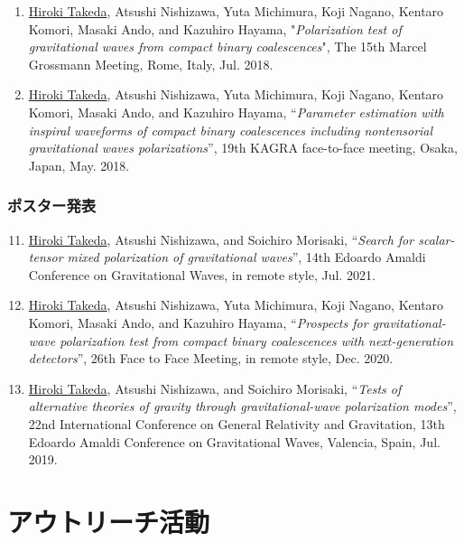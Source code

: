 \documentclass[uplatex, 11pt]{jsarticle}
\begin{document}
\begin{enumerate}
\item \uline{Hiroki Takeda}, Atsushi Nishizawa, Yuta Michimura, Koji Nagano, Kentaro Komori, Masaki Ando, and Kazuhiro Hayama, "\emph{Polarization test of gravitational waves from compact binary coalescences}", The 15th Marcel Grossmann Meeting, Rome, Italy, Jul. 2018.\\

\item \uline{Hiroki Takeda}, Atsushi Nishizawa, Yuta Michimura, Koji Nagano, Kentaro Komori, Masaki Ando, and Kazuhiro Hayama, “\emph{Parameter estimation with inspiral waveforms of compact binary coalescences including nontensorial gravitational waves polarizations}”, 19th KAGRA face-to-face meeting, Osaka, Japan, May. 2018.
\end{enumerate}

\subsubsection*{ポスター発表}

\begin{enumerate}
\setcounter{enumi}{10}
\item \uline{Hiroki Takeda}, Atsushi Nishizawa, and Soichiro Morisaki, “\emph{Search for scalar-tensor mixed polarization of gravitational waves}”, 14th Edoardo Amaldi Conference on Gravitational Waves, in remote style, Jul. 2021.\\

\item \uline{Hiroki Takeda}, Atsushi Nishizawa, Yuta Michimura, Koji Nagano, Kentaro Komori, Masaki Ando, and Kazuhiro Hayama, “\emph{Prospects for gravitational-wave polarization test from compact binary coalescences with next-generation detectors}”, 26th Face to Face Meeting, in remote style, Dec. 2020.\\

\item \uline{Hiroki Takeda}, Atsushi Nishizawa, and Soichiro Morisaki, “\emph{Tests of alternative theories of gravity through gravitational-wave polarization modes}”, 22nd International Conference on General Relativity and Gravitation, 13th Edoardo Amaldi Conference on Gravitational Waves, Valencia, Spain, Jul. 2019.\\

\end{enumerate}

\section*{アウトリーチ活動}
\end{document}
